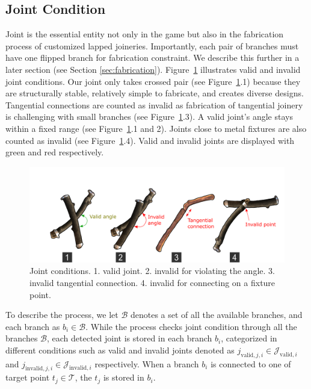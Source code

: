 \subsection{Joint Condition}
\label{sec:joint}
Joint is the essential entity not only in the game but also in the fabrication process of customized lapped joineries.
Importantly, each pair of branches must have one flipped branch for fabrication constraint.
We describe this further in a later section (see Section \ref{sec:fabrication}).
Figure~\ref{fig:joint_condition} illustrates valid and invalid joint conditions.
Our joint only takes crossed pair (see Figure~\ref{fig:joint_condition}.1) because they are structurally stable, relatively simple to fabricate, and creates diverse designs.
Tangential connections are counted as invalid as fabrication of tangential joinery is challenging with small branches (see Figure~\ref{fig:joint_condition}.3).
A valid joint's angle stays within a fixed range (see Figure~\ref{fig:joint_condition}.1 and 2).
Joints close to metal fixtures are also counted as invalid (see Figure~\ref{fig:joint_condition}.4).
Valid and invalid joints are displayed with green and red respectively.

\begin{figure}[ht]
	\begin{center}
		\includegraphics[width = 0.4\paperwidth]{images/system/joint_conditions_2.png}
		\caption{Joint conditions. 1. valid joint. 2. invalid for violating the angle. 3. invalid tangential connection. 4. invalid for connecting on a fixture point. }
		\label{fig:joint_condition}
	\end{center}
\end{figure}




To describe the process, we let $\mathcal{B}$ denotes a set of all the available branches, and each branch as $ b_i \in \mathcal{B}$.
While the process checks joint condition through all the branches $\mathcal{B}$, each detected joint is stored in each branch $b_i$, categorized in different conditions such as valid and invalid joints denoted as $j_{\text{valid}, j, i} \in \mathcal{J}_{\text{valid},i}$ and $j_{\text{invalid}, j, i} \in \mathcal{J}_{\text{invalid},i}$ respectively.
When a branch $b_i$ is connected to one of target point $t_j \in \mathcal{T} $, the $t_j$ is stored in $b_i$.


